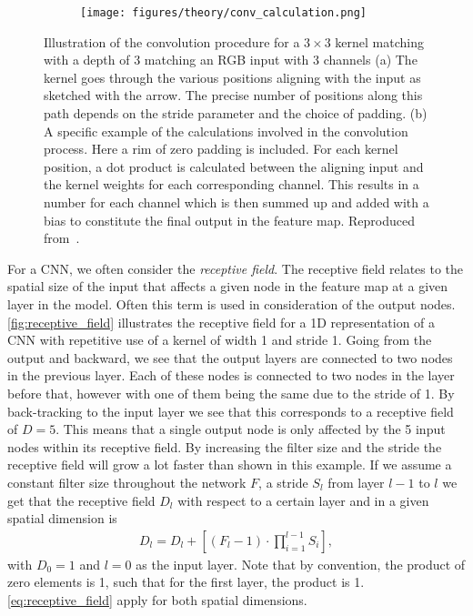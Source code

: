 \begin{figure}[!htb]
  \centering
  \begin{subfigure}[t]{0.26\textwidth}
    \centering
    \raggedleft
    \caption{}
  \end{subfigure}
  \hfill
  \begin{subfigure}[t]{0.70\textwidth}
    \centering
    \texttt{[image: figures/theory/conv\_calculation.png]}
    \caption{}
    \label{fig:conv_calculation}
  \end{subfigure}
  \hfill

  \caption{Illustration of the convolution procedure for a $3 \times 3$ kernel matching with a depth of 3 matching an RGB input with 3 channels (a) The kernel goes through the various positions aligning with the input as sketched with the arrow. The precise number of positions along this path depends on the stride parameter and the choice of padding. (b) A specific example of the calculations involved in the convolution process. Here a rim of zero padding is included. For each kernel position, a dot product is calculated between the aligning input and the kernel weights for each corresponding channel. This results in a number for each channel which is then summed up and added with a bias to constitute the final output in the feature map. Reproduced from~\cite{CNN_calc}.}
  \label{fig:conv_example}
\end{figure}

For a \acrshort{CNN}, we often consider the \textit{receptive field}. The
receptive field relates to the spatial size of the input that affects a given
node in the feature map at a given layer in the model. Often this term is used
in consideration of the output nodes. \cref{fig:receptive_field} illustrates the
receptive field for a 1D representation of a \acrshort{CNN} with repetitive use
of a kernel of width 1 and stride 1. Going from the output and backward, we see that the output layers are connected to two nodes in the previous layer. Each of these nodes is connected to two nodes in the layer before that, however with one of them being the same due to the stride of 1. By back-tracking to the input layer we see that this corresponds to a receptive field of $D = 5$. This means that a single output node is only affected by the 5 input nodes within its receptive field. By increasing the filter size and
the stride the receptive field will grow a lot faster than shown in this example. If we assume a constant filter size throughout the network $F$, a stride $S_l$ from layer $l-1$ to $l$ we get that the receptive field $D_l$ with respect to a certain layer and in a given spatial dimension is
\begin{align}
    D_l = D_l + \left[(F_l - 1) \cdot \prod_{i=1}^{l-1}S_i \right],
    \label{eq:receptive_field}
\end{align}
with $D_0 = 1$ and $l=0$ as the input layer. Note that by convention, the
product of zero elements is 1, such that for the first layer, the product is 1. \cref{eq:receptive_field} apply for both spatial dimensions. 

